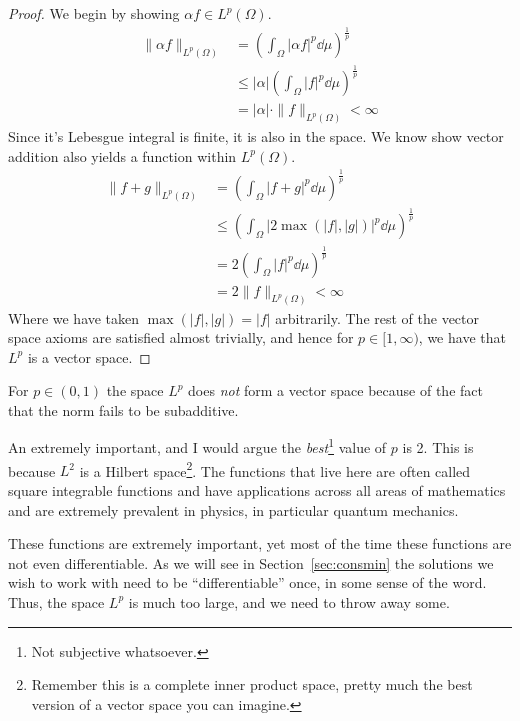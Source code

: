 \begin{proof}
    We begin by showing \(\alpha f\in L^p(\Omega)\).
    \begin{align*}
        \|\alpha f\|_{L^p(\Omega)} & = \left(\int_\Omega |\alpha f|^p\dd{\mu}\right)^\frac{1}{p} \\
                                   & \leq |\alpha|\left(\int_\Omega |f|^p\dd{\mu}\right)^\frac{1}{p}\\
                                   & = |\alpha|\cdot\|f\|_{L^p(\Omega)} < \infty
    \end{align*}
    Since it's Lebesgue integral is finite, it is also in the space. We know
    show vector addition also yields a function within \(L^p(\Omega)\).
    \begin{align*}
        \|f + g\|_{L^p(\Omega)} & = \left(\int_\Omega |f + g|^p\dd{\mu}\right)^\frac{1}{p} \\
                                & \leq \left(\int_\Omega |2\max{(|f|,|g|)}|^p\dd{\mu}\right)^\frac{1}{p} \\
                                & = 2\left(\int_\Omega |f|^p\dd{\mu}\right)^\frac{1}{p} \\
                                & = 2\|f\|_{L^p(\Omega)} < \infty
    \end{align*}
    Where we have taken \(\max{(|f|,|g|)} = |f|\) arbitrarily. The rest of the
    vector space axioms are satisfied almost trivially, and hence for
    \(p\in[1,\infty)\), we have that \(L^p\) is a vector space. %
\end{proof}

\begin{remark}
    For \(p\in(0,1)\) the space \(L^p\) does \textit{not} form a vector space
    because of the fact that the norm fails to be subadditive.
\end{remark}

An extremely important, and I would argue the \textit{best}\footnote{Not
subjective whatsoever.} value of \(p\) is 2. This is because \(L^2\) is a
Hilbert space\footnote{Remember this is a complete inner product space, pretty
much the best version of a vector space you can imagine.}. The functions that
live here are often called square integrable functions and have applications
across all areas of mathematics and are extremely prevalent in physics, in
particular quantum mechanics.

These functions are extremely important, yet most of the time these functions
are not even differentiable. As we will see in Section~\ref{sec:consmin} the
solutions we wish to work with need to be ``differentiable'' once, in some sense
of the word. Thus, the space \(L^p\) is much too large, and we need to throw
away some.

